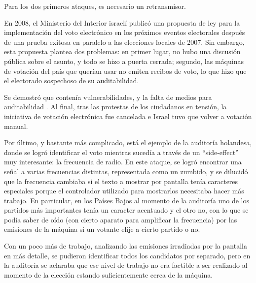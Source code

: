 Para los dos primeros ataques, es necesario un retransmisor.

En 2008, el Ministerio del Interior israelí publicó una propuesta de ley para la implementación del voto electrónico en los próximos eventos electorales después de una prueba exitosa en paralelo a las elecciones locales de 2007. Sin embargo, esta propuesta plantea dos problemas: en primer lugar, no hubo una discusión pública sobre el asunto, y todo se hizo a puerta cerrada; segundo, las máquinas de votación del país que querían usar no emiten recibos de voto, lo que hizo que el electorado sospechoso de su auditabilidad\cite{e-lected}.

Se demostró que contenía vulnerabilidades, y la falta de medios para auditabilidad .
Al final, tras las protestas de los ciudadanos en tensión, la iniciativa de votación electrónica fue cancelada e Israel tuvo que volver a votación manual.


Por último, y bastante más complicado, está el ejemplo de la auditoría holandesa, donde se logró identificar el voto mientras sucedía a través de un ``side-effect'' muy interesante: la frecuencia de radio\cite{holanda}. En este ataque, se logró encontrar una señal a varias frecuencias distintas, representada como un zumbido, y se dilucidó que la frecuencia cambiaba si el texto a mostrar por pantalla tenía caracteres especiales porque el controlador utilizado para mostrarlos necesitaba hacer más trabajo. En particular, en los Países Bajos al momento de la auditoría uno de los partidos más importantes tenía un caracter acentuado y el otro no, con lo que se podía saber de oído (con cierto aparato para amplificar la frecuencia) por las emisiones de la máquina si un votante elije a cierto partido o no.

Con un poco más de trabajo, analizando las emisiones irradiadas por la pantalla en más detalle, se pudieron identificar todos los candidatos por separado, pero en la auditoría se aclaraba que ese nivel de trabajo no era factible a ser realizado al momento de la elección estando suficientemente cerca de la máquina.
